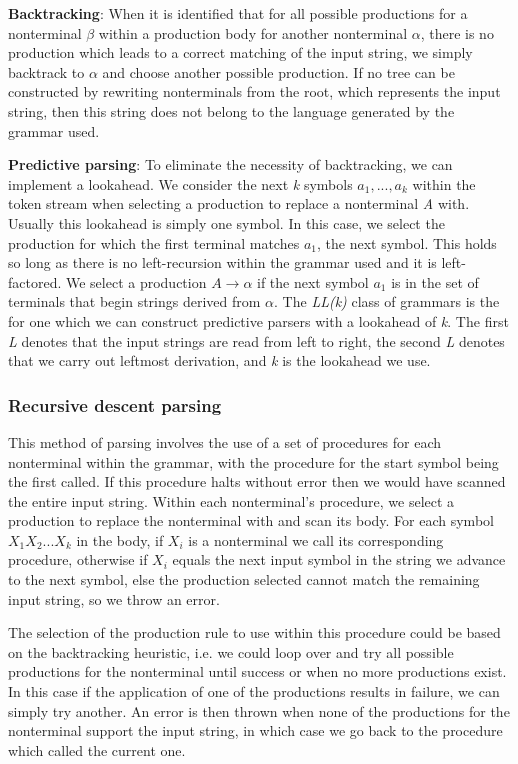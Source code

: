 \documentclass[a4paper, 11pt]{article}
\begin{document}
\textbf{Backtracking}: When it is identified that for all possible productions for a nonterminal $\beta$ within a production body for another nonterminal $\alpha$, there is no production which leads to a correct matching of the input string, we simply backtrack to $\alpha$ and choose another possible production. If no tree can be constructed by rewriting nonterminals from the root, which represents the input string, then this string does not belong to the language generated by the grammar used.

\textbf{Predictive parsing}: To eliminate the necessity of backtracking, we can implement a lookahead. We consider the next \textit{k} symbols $a_1, ..., a_k$ within the token stream when selecting a production to replace a nonterminal \textit{A} with. Usually this lookahead is simply one symbol. In this case, we select the production for which the first terminal matches $a_{1}$, the next symbol. This holds so long as there is no left-recursion within the grammar used and it is left-factored. We select a production $\textit{A}\rightarrow\alpha$ if the next symbol $a_1$ is in the set of terminals that begin strings derived from $\alpha$. The \textit{LL(k)} class of grammars is the for one which we can construct predictive parsers with a lookahead of \textit{k}. The first \textit{L} denotes that the input strings are read from left to right, the second \textit{L} denotes that we carry out leftmost derivation, and \textit{k} is the lookahead we use.

\subsubsection{Recursive descent parsing}
This method of parsing involves the use of a set of procedures for each nonterminal within the grammar, with the procedure for the start symbol being the first called. If this procedure halts without error then we would have scanned the entire input string. Within each nonterminal's procedure, we select a production to replace the nonterminal with and scan its body. For each symbol $X_1X_2...X_k$ in the body, if $X_i$ is a nonterminal we call its corresponding procedure, otherwise if $X_i$ equals the next input symbol in the string we advance to the next symbol, else the production selected cannot match the remaining input string, so we throw an error.

The selection of the production rule to use within this procedure could be based on the backtracking heuristic, i.e. we could loop over and try all possible productions for the nonterminal until success or when no more productions exist. In this case if the application of one of the productions results in failure, we can simply try another. An error is then thrown when none of the productions for the nonterminal support the input string, in which case we go back to the procedure which called the current one.
\end{document}
